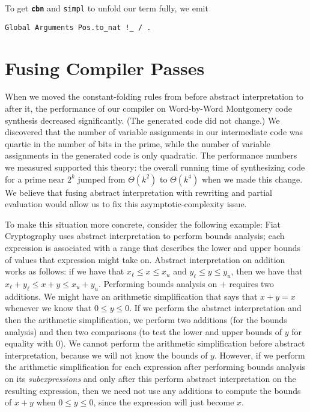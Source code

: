 \documentclass[a4paper,USenglish,cleveref,autoref,thm-restate]{lipics-v2021}
\newcommand{\tacsimpl}{\texttt{simpl}}
\newcommand{\taccbn}{\textbf{\texttt{cbn}}}
\begin{document}
To get \taccbn{} and \tacsimpl{} to unfold our term fully, we emit
\begin{verbatim}
Global Arguments Pos.to_nat !_ / .
\end{verbatim}


\FloatBarrier\section{Fusing Compiler Passes}\label{sec:fusing-compiler-passes}

When we moved the
constant-folding rules
from before abstract interpretation to after it, the performance of our compiler on Word-by-Word Montgomery code synthesis decreased significantly.
(The generated code did not change.)
We discovered that the number of variable assignments in our intermediate code was quartic in the number of bits in the prime, while the number of variable assignments in the generated code is only quadratic.
The performance numbers we measured supported this theory: the overall running time of synthesizing code for a prime near $2^k$ jumped from $\Theta(k^2)$ to $\Theta(k^4)$ when we made this change.
We believe that fusing abstract interpretation with rewriting and partial evaluation would allow us to fix this asymptotic-complexity issue.

To make this situation more concrete, consider the following example:
Fiat Cryptography uses abstract interpretation to perform bounds analysis; each expression is associated with a range that describes the lower and upper bounds of values that expression might take on.
Abstract interpretation on addition works as follows: if we have that $x_\ell \le x \le x_u$ and $y_\ell \le y \le y_u$, then we have that $x_\ell + y_\ell \le x + y \le x_u + y_u$.
Performing bounds analysis on $+$ requires two additions.
We might have an arithmetic simplification that says that $x + y = x$ whenever we know that $0 \le y \le 0$.
If we perform the abstract interpretation and then the arithmetic simplification, we perform two additions (for the bounds analysis) and then two comparisons (to test the lower and upper bounds of $y$ for equality with 0).
We cannot perform the arithmetic simplification before abstract interpretation, because we will not know the bounds of $y$.
However, if we perform the arithmetic simplification for each expression after performing bounds analysis on its \emph{subexpressions} and only after this perform abstract interpretation on the resulting expression, then we need not use any additions to compute the bounds of $x + y$ when $0 \le y \le 0$, since the expression will just become $x$.
\end{document}
